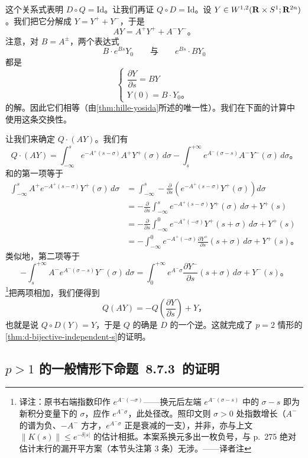 这个关系式表明 $D\circ Q=\mathrm{Id}$。让我们再证 $Q\circ D=\mathrm{Id}$。设 $Y\in W^{1,2}(\mathbf{R}\times S^{1};\mathbf{R}^{2n})$。我们把它分解成 $Y=Y^{+}+Y^{-}$，于是
\[
AY=A^{+}Y^{+}+A^{-}Y^{-}\text{。}
\]
注意，对 $B=A^{\pm}$，两个表达式
\[
B\cdot e^{Bs}Y_0\qquad\text{与}\qquad e^{Bs}\cdot BY_0
\]
都是
\[
\left\{\begin{array}{l}
\dfrac{\partial Y}{\partial s}=BY\\[8pt]
Y(0)=B\cdot Y_0\text{。}
\end{array}\right.
\]
的解。因此它们相等（由\cref{thm:hille-yosida}所述的唯一性）。我们在下面的计算中使用这条交换性。

让我们来确定 $Q\cdot(AY)$。我们有
\[
Q\cdot(AY)=\int_{-\infty}^{s}e^{-A^{+}(s-\sigma)}A^{+}Y^{+}(\sigma)\,d\sigma-\int_{s}^{+\infty}e^{A^{-}(\sigma-s)}A^{-}Y^{-}(\sigma)\,d\sigma\text{。}
\]
和的第一项等于
\[
\begin{aligned}
\int_{-\infty}^{s}A^{+}e^{-A^{+}(s-\sigma)}Y^{+}(\sigma)\,d\sigma
&=\int_{-\infty}^{s}-\frac{\partial}{\partial s}\left(e^{-A^{+}(s-\sigma)}Y^{+}(\sigma)\right)d\sigma\\
&=-\frac{\partial}{\partial s}\int_{-\infty}^{s}e^{-A^{+}(s-\sigma)}Y^{+}(\sigma)\,d\sigma+Y^{+}(s)\\
&=-\frac{\partial}{\partial s}\int_{-\infty}^{0}e^{-A^{+}(-\sigma)}Y^{+}(s+\sigma)\,d\sigma+Y^{+}(s)\\
&=-\int_{-\infty}^{0}e^{-A^{+}(-\sigma)}\frac{\partial Y^{+}}{\partial s}(s+\sigma)\,d\sigma+Y^{+}(s)\text{。}
\end{aligned}
\]
类似地，第二项等于
\[
-\int_{s}^{+\infty}A^{-}e^{A^{-}(\sigma-s)}Y^{-}(\sigma)\,d\sigma
=\int_{0}^{+\infty}e^{A^{-}\sigma}\frac{\partial Y^{-}}{\partial s}(s+\sigma)\,d\sigma+Y^{-}(s)\text{。}
\]
\footnote{译注：原书右端指数印作 $e^{A^{-}(-\sigma)}$——换元后左端 $e^{A^{-}(\sigma-s)}$ 中的 $\sigma-s$ 即为新积分变量下的 $\sigma$，应作 $e^{A^{-}\sigma}$，此处径改。照印文则 $\sigma>0$ 处指数增长（$A^{-}$ 的谱为负、$-A^{-}$ 方才\trMonotone，$e^{A^{-}\sigma}$ 正是衰减的一支），并非\trBounded{}\trSemigroup，亦与上文 $\|K(s)\|\le e^{-\delta|s|}$ 的估计相抵。本案系换元多出一枚负号，与 p.~275 绝对\trConvergence{}估计末行的漏开平方案（本节头注第 3 条）无涉。——译者注}把两项相加，我们便得到
\[
Q(AY)=-Q\left(\frac{\partial Y}{\partial s}\right)+Y\text{，}
\]
也就是说 $Q\circ D(Y)=Y$，于是 $Q$ 的确是 $D$ 的一个逆。这就完成了 $p=2$ 情形的\cref{thm:d-bijective-independent-s}的证明。

\subsection{$p>1$ 的一般情形下命题~8.7.3~的证明}
\label{subsec:proof-general-case}

